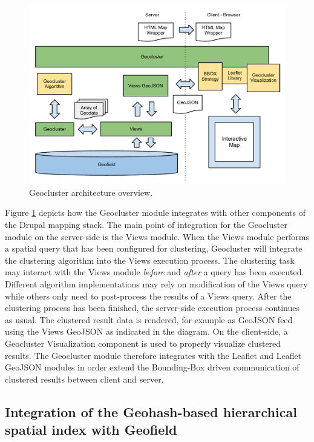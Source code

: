 \begin{figure}[h]
  \begin{center}
    \includegraphics[width=1\textwidth]{figures/geocluster_architecture.pdf}
    \caption{Geocluster architecture overview.}
    \label{fig:geocluster-architecture}
  \end{center}
\end{figure}

Figure \ref{fig:geocluster-architecture} depicts how the Geocluster module integrates with other components of the Drupal mapping stack. The main point of integration for the Geocluster module on the server-side is the Views module. When the Views module performs a spatial query that has been configured for clustering, Geocluster will integrate the clustering algorithm into the Views execution process. The clustering task may interact with the Views module \textit{before} and \textit{after} a query has been executed. Different algorithm implementations may rely on modification of the Views query while others only need to post-process the results of a Views query. After the clustering process has been finished, the server-side execution process continues as usual. The clustered result data is rendered, for example as GeoJSON feed using the Views GeoJSON as indicated in the diagram. On the client-side, a Geocluster Visualization component is used to properly visualize clustered results. The Geocluster module therefore integrates with the Leaflet and Leaflet GeoJSON modules in order extend the Bounding-Box driven communication of clustered results between client and server.


\subsection{Integration of the Geohash-based hierarchical spatial index with Geofield}

